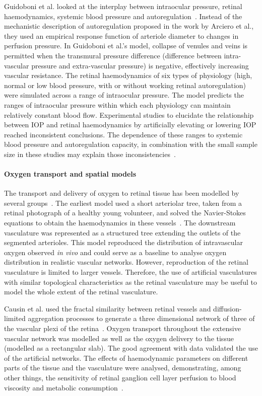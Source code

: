 \documentclass{article}
\begin{document}
Guidoboni et al. looked at the interplay between intraocular pressure, retinal haemodynamics, systemic blood pressure and autoregulation~\cite{Guidoboni_2014a}.
Instead of the mechanistic description of autoregulation proposed in the work by Arciero et al., they used an empirical response function of arteriole diameter to changes in perfusion pressure.
In Guidoboni et al.'s model, collapse of venules and veins is permitted when the transmural pressure difference (difference between intra-vascular pressure and extra-vascular pressure) is negative, effectively increasing vascular resistance.
The retinal haemodynamics of six types of physiology (high, normal or low blood pressure, with or without working retinal autoregulation) were simulated across a range of intraocular pressure.
The model predicts the ranges of intraocular pressure within which each physiology can maintain relatively constant blood flow.
Experimental studies to elucidate the relationship between IOP and retinal haemodynamics by artificially elevating or lowering IOP reached inconsistent conclusions\cite{Conway_2010,Findl_1997}.
The dependence of these ranges to systemic blood pressure and autoregulation capacity, in combination with the small sample size in these studies may explain those inconsistencies~\cite{Guidoboni_2014a}.

\paragraph*{Oxygen transport and spatial models}

The transport and delivery of oxygen to retinal tissue has been modelled by several groups~\cite{Aquah_et_al_2021,Causin_2015,Liu_2009}.
The earliest model used a short arteriolar tree, taken from a retinal photograph of a healthy young volunteer, and solved the Navier-Stokes equations to obtain the haemodynamics in these vessels~\cite{Liu_2009}.
The downstream vasculature was represented as a structured tree extending the outlets of the segmented arterioles.
This model reproduced the distribution of intravascular oxygen observed \textit{in vivo} and could serve as a baseline to analyse oxygen distribution in realistic vascular networks.
However, reproduction of the retinal vasculature is limited to larger vessels.
Therefore, the use of artificial vasculatures with similar topological characteristics as the retinal vasculature may be useful to model the whole extent of the retinal vasculature.

Causin et al. used the fractal similarity between retinal vessels and diffusion-limited aggregation processes to generate a three dimensional network of three of the vascular plexi of the retina~\cite{Causin_2015}.
Oxygen transport throughout the extensive vascular network was modelled as well as the oxygen delivery to the tissue (modelled as a rectangular slab).
The good agreement with data validated the use of the artificial networks.
The effects of haemodynamic parameters on different parts of the tissue and the vasculature were analysed, demonstrating, among other things, the sensitivity of retinal ganglion cell layer perfusion to blood viscosity and metabolic consumption~\cite{Causin_2015}.
\end{document}
